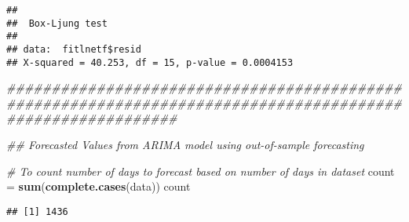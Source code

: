 \documentclass[
]{article}
\newenvironment{Shaded}{\begin{snugshade}}{\end{snugshade}}
\newcommand{\CommentTok}[1]{\textcolor[rgb]{0.56,0.35,0.01}{\textit{#1}}}
\newcommand{\KeywordTok}[1]{\textcolor[rgb]{0.13,0.29,0.53}{\textbf{#1}}}
\newcommand{\NormalTok}[1]{#1}
\newcommand{\OperatorTok}[1]{\textcolor[rgb]{0.81,0.36,0.00}{\textbf{#1}}}
\newcommand{\StringTok}[1]{\textcolor[rgb]{0.31,0.60,0.02}{#1}}
\begin{document}
\begin{verbatim}
## 
##  Box-Ljung test
## 
## data:  fitlnetf$resid
## X-squared = 40.253, df = 15, p-value = 0.0004153
\end{verbatim}

\begin{Shaded}
\begin{Highlighting}[]
\CommentTok{###########################################################################################################}

\CommentTok{## Forecasted Values from ARIMA model using out-of-sample forecasting}
      
  \CommentTok{# To count number of days to forecast based on number of days in dataset}
\NormalTok{    count =}\StringTok{ }\KeywordTok{sum}\NormalTok{(}\KeywordTok{complete.cases}\NormalTok{(data))}
\NormalTok{    count}
\end{Highlighting}
\end{Shaded}

\begin{verbatim}
## [1] 1436
\end{verbatim}

\begin{Shaded}
\end{Shaded}
\end{document}
